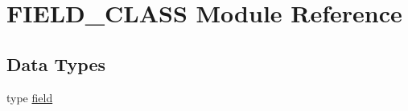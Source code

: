 \hypertarget{namespaceFIELD__CLASS}{
\section{FIELD\_\-CLASS Module Reference}
\label{namespaceFIELD__CLASS}
}
\subsection*{Data Types}
\begin{DoxyCompactItemize}
\item 
type \hyperlink{typeFIELD__CLASS_1_1field}{field}
\end{DoxyCompactItemize}
